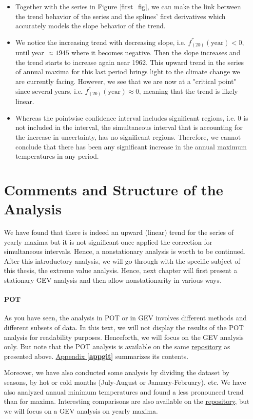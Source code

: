 \begin{itemize}
\item Together with the series in Figure \ref{first_fig}, we can make the link between the trend behavior of the series and the splines' first derivatives which accurately models the slope behavior of the trend. 
\item We notice the increasing trend with decreasing slope, i.e. $ f_{(20)}^{''}(\text{year})<0$, until year $\approx 1945$ where it becomes negative. Then the slope increases and the trend starts to increase again near 1962. This upward trend in the series of annual maxima for this last period brings light to the climate change we are currently facing. However, we see that we are now at a "critical point" since several years, i.e. $f_{(20)}^{''}(\text{year})\approx 0$, meaning that the trend is likely linear. 

\item  Whereas the pointwise confidence interval includes significant regions, i.e. 0 is not included in the interval, the simultaneous interval that is accounting for the increase in uncertainty, has no significant regions. Therefore, we cannot conclude that there has been any significant increase in the annual maximum temperatures in any period.

\end{itemize}


\section{Comments and Structure of the Analysis }

 We have found that there is indeed an upward (linear) trend for the series of yearly maxima but it is not significant once applied the correction for simultaneous intervals.
Hence, a nonstationary analysis is worth to be continued.
After this introductory analysis, we will go through with the specific subject of this thesis, the extreme value analysis. Hence, next chapter will first present a stationary GEV analysis and then allow nonstationarity in various ways.


\paragraph*{POT} 
As you have seen, the analysis in POT or in GEV involves different methods and different subsets of data. In this text, we will not display the results of the POT analysis for readability purposes. Henceforth, we will focus on the GEV analysis only. But note that the POT analysis is available on the same \href{https://github.com/proto4426/PissoortThesis}{repository} as presented above.
\hyperref[appgit]{Appendix\textbf{ \ref{appgit}}} summarizes its contents.


Moreover, we have also conducted some analysis by dividing the dataset by seasons, by hot or cold months (July-August or January-February), etc. We have also analyzed annual minimum temperatures and found a less pronounced trend than for maxima.
Interesting comparisons are also available on the \href{https://github.com/proto4426/PissoortThesis}{repository}, but we will focus on a GEV analysis on yearly maxima.